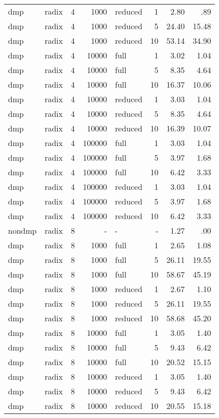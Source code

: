 \begin{center}
\begin{small}
\begin{longtable}{llrrlrrr}
dmp & radix & 4 & 1000 & reduced & 1 & 2.80 & .89\\
dmp & radix & 4 & 1000 & reduced & 5 & 24.40 & 15.48\\
dmp & radix & 4 & 1000 & reduced & 10 & 53.14 & 34.90\\
dmp & radix & 4 & 10000 & full & 1 & 3.02 & 1.04\\
dmp & radix & 4 & 10000 & full & 5 & 8.35 & 4.64\\
dmp & radix & 4 & 10000 & full & 10 & 16.37 & 10.06\\
dmp & radix & 4 & 10000 & reduced & 1 & 3.03 & 1.04\\
dmp & radix & 4 & 10000 & reduced & 5 & 8.35 & 4.64\\
dmp & radix & 4 & 10000 & reduced & 10 & 16.39 & 10.07\\
dmp & radix & 4 & 100000 & full & 1 & 3.03 & 1.04\\
dmp & radix & 4 & 100000 & full & 5 & 3.97 & 1.68\\
dmp & radix & 4 & 100000 & full & 10 & 6.42 & 3.33\\
dmp & radix & 4 & 100000 & reduced & 1 & 3.03 & 1.04\\
dmp & radix & 4 & 100000 & reduced & 5 & 3.97 & 1.68\\
dmp & radix & 4 & 100000 & reduced & 10 & 6.42 & 3.33\\
\hline
nondmp & radix & 8 & - & - & - & 1.27 & .00\\
dmp & radix & 8 & 1000 & full & 1 & 2.65 & 1.08\\
dmp & radix & 8 & 1000 & full & 5 & 26.11 & 19.55\\
dmp & radix & 8 & 1000 & full & 10 & 58.67 & 45.19\\
dmp & radix & 8 & 1000 & reduced & 1 & 2.67 & 1.10\\
dmp & radix & 8 & 1000 & reduced & 5 & 26.11 & 19.55\\
dmp & radix & 8 & 1000 & reduced & 10 & 58.68 & 45.20\\
dmp & radix & 8 & 10000 & full & 1 & 3.05 & 1.40\\
dmp & radix & 8 & 10000 & full & 5 & 9.43 & 6.42\\
dmp & radix & 8 & 10000 & full & 10 & 20.52 & 15.15\\
dmp & radix & 8 & 10000 & reduced & 1 & 3.05 & 1.40\\
dmp & radix & 8 & 10000 & reduced & 5 & 9.43 & 6.42\\
dmp & radix & 8 & 10000 & reduced & 10 & 20.55 & 15.18\\

\end{longtable}
\end{small}
\end{center}
